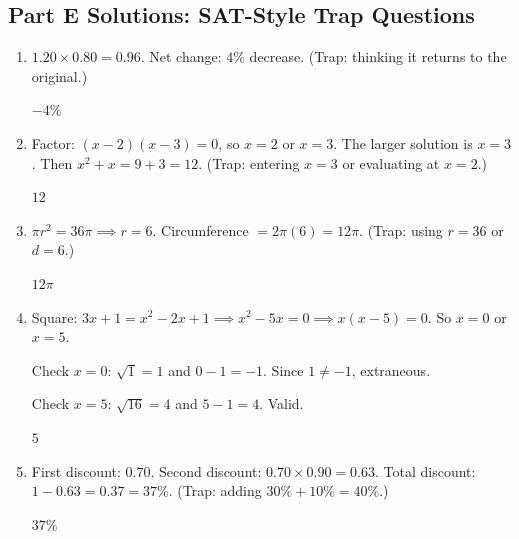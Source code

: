 \documentclass[14pt]{extarticle}
\begin{document}
\subsection*{Part E Solutions: SAT-Style Trap Questions}
\begin{enumerate}
  \item \(1.20 \times 0.80 = 0.96\). Net change: \(4\%\) decrease. (Trap: thinking it returns to the original.)

  \(\boxed{-4\%}\)

  \item Factor: \((x-2)(x-3) = 0\), so \(x = 2\) or \(x = 3\). The larger solution is \(x = 3\). Then \(x^2 + x = 9 + 3 = 12\). (Trap: entering \(x = 3\) or evaluating at \(x = 2\).)

  \(\boxed{12}\)

  \item \(\pi r^2 = 36\pi \implies r = 6\). Circumference \(= 2\pi(6) = 12\pi\). (Trap: using \(r = 36\) or \(d = 6\).)

  \(\boxed{12\pi}\)

  \item Square: \(3x + 1 = x^2 - 2x + 1 \implies x^2 - 5x = 0 \implies x(x-5) = 0\). So \(x = 0\) or \(x = 5\).

  Check \(x = 0\): \(\sqrt{1} = 1\) and \(0 - 1 = -1\). Since \(1 \neq -1\), extraneous.

  Check \(x = 5\): \(\sqrt{16} = 4\) and \(5 - 1 = 4\). Valid.

  \(\boxed{5}\)

  \item First discount: \(0.70\). Second discount: \(0.70 \times 0.90 = 0.63\). Total discount: \(1 - 0.63 = 0.37 = 37\%\). (Trap: adding \(30\% + 10\% = 40\%\).)

  \(\boxed{37\%}\)
\end{enumerate}

\end{document}
